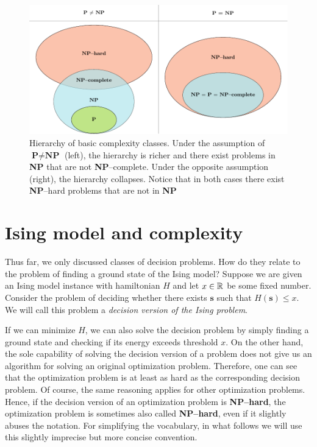 \begin{figure}
    \includegraphics[width=\textwidth]{figures/complexity_new.pdf}
    \caption{Hierarchy of basic complexity classes. Under the assumption of $\textbf{P} \ne \textbf{NP}$ (left), the hierarchy is richer and there exist problems in \textbf{NP}  that are not \textbf{NP}--complete. Under the opposite assumption (right), the hierarchy collapses. Notice that in both cases there exist \textbf{NP}--hard problems that are not in \textbf{NP}
    }
    \label{fig:complexity}
\end{figure}



\section{Ising model and complexity}

Thus far, we only discussed classes of decision problems. How do they relate to the problem of
finding a ground state of the Ising model? Suppose we are given an Ising model instance with
hamiltonian $H$ and let $x \in \mathbb{R}$ be some fixed number. Consider the problem of deciding whether
there exists $\mathbf{s}$ such that $H(\mathbf{s}) \le x$. We will call this problem a
\emph{decision version of the Ising problem}.

If we can minimize $H$, we can also solve the decision problem by simply finding a ground state and
checking if its energy exceeds threshold $x$. On the other hand, the sole capability of solving the
decision version of a problem does not give us an algorithm for solving an original optimization
problem. Therefore, one can see that the optimization problem is at least as hard as the
corresponding decision problem. Of course, the same reasoning applies for other optimization
problems. Hence, if the decision version of an optimization problem is \textbf{NP--hard},
the optimization problem is sometimes also called \textbf{NP--hard}, even if it slightly abuses the
notation. For simplifying the vocabulary, in what follows we will use this slightly
imprecise but more concise convention.

